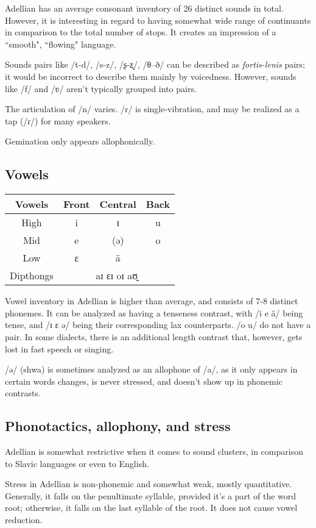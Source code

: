 \documentclass[12pt]{article}
\begin{document}
	Adellian has an average consonant inventory of 26 distinct sounds in total. However, it is interesting in regard to having somewhat wide range of continuants in comparison to the total number of stops. It creates an impression of a ``smooth", ``flowing" language.

	Sounds pairs like /t-d/, /s-z/, /ʂ-ʐ/, /θ–ð/ can be described as \emph{fortis-lenis} pairs; it would be incorrect to describe them mainly by voicedness. However, sounds like /f/ and /ʋ/ aren't typically grouped into pairs.

	The articulation of /n/ varies.	/r/ is single-vibration, and may be realized as a tap (/ɾ/) for many speakers.

	Gemination only appears allophonically.

	\subsection{Vowels}

	\begin{tabular}{|| c | c c c || }
		\hline
		Vowels & Front & Central & Back \\
		\hline
		High & i & ɪ & u \\
		Mid & e & (ə) & o \\
		Low & ɛ & ä & \\
		Dipthongs & \multicolumn{3}{c||}{aɪ ɛɪ oɪ aʊ̯} \\
		\hline
	\end{tabular}

	Vowel inventory in Adellian is higher than average, and consists of 7-8 distinct phonemes. It can be analyzed as having a tenseness contrast, with /i e ä/ being tense, and /ɪ ɛ ə/ being their corresponding lax counterparts. /o u/ do not have a pair. In some dialects, there is an additional length contrast that, however, gets lost in fast speech or singing.

	/ə/ (shwa) is sometimes analyzed as an allophone of /a/, as it only appears in certain words changes, is never stressed, and doesn't show up in phonemic contrasts.

	\subsection{Phonotactics, allophony, and stress}

	Adellian is somewhat restrictive when it comes to sound clusters, in comparison to Slavic languages or even to English.

	Stress in Adellian is non-phonemic and somewhat weak, mostly quantitative. Generally, it falls on the penultimate syllable, provided it's a part of the word root; otherwise, it falls on the last syllable of the root. It does not cause vowel reduction.
\end{document}
